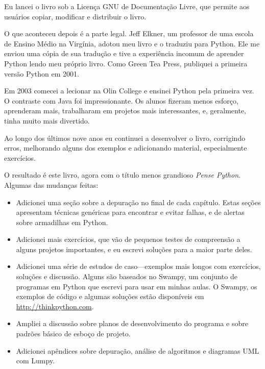 \documentclass[10pt]{book}
\begin{document}
Eu lancei o livro sob a Licença GNU de Documentação Livre,
que permite aos usuários copiar, modificar e distribuir o livro.

O que aconteceu depois é a parte legal. Jeff Elkner, um professor de uma escola
de Ensino Médio na Virgínia, adotou meu livro e o traduziu para
Python. Ele me enviou uma cópia de sua tradução e tive a
experiência incomum de aprender Python lendo meu próprio livro.
Como Green Tea Press, publiquei a primeira versão Python em 2001.

Em 2003 comecei a lecionar na Olin College e ensinei
Python pela primeira vez. O contraste com Java foi impressionante.
Os alunos fizeram menos esforço, aprenderam mais, trabalharam em projetos
mais interessantes, e, geralmente, tinha muito mais divertido.

Ao longo dos últimos nove anos eu continuei a desenvolver o livro,
corrigindo erros, melhorando alguns dos exemplos e
adicionando material, especialmente exercícios.

O resultado é este livro, agora com o título menos grandioso
{\em Pense Python}. Algumas das mudanças feitas:

\begin{itemize}

\item Adicionei uma seção sobre a depuração no final de cada capítulo.
  Estas seções apresentam técnicas genéricas para encontrar e evitar
  falhas, e de alertas sobre armadilhas em Python.

\item Adicionei mais exercícios, que vão de pequenos testes de
  compreensão a alguns projetos importantes, e eu escrevi
  soluções para a maior parte deles.

\item Adicionei uma série de estudos de caso---exemplos mais longos com
  exercícios, soluções e discussão. Alguns são baseados no
  Swampy, um conjunto de programas em Python que escrevi para usar em minhas aulas.
  O Swampy, os exemplos de código e algumas soluções estão disponíveis em
  \url{http://thinkpython.com}.
  
\item Ampliei a discussão sobre planos de desenvolvimento do programa
  e sobre padrões básico de esboço de projeto.

\item Adicionei apêndices sobre depuração, análise de algoritmos e
  diagramas UML com Lumpy.

\end{itemize}
\end{document}
